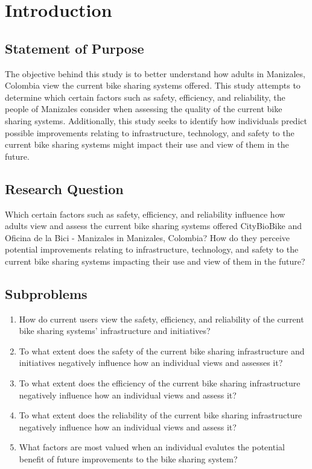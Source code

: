 \documentclass[12pt]{article}
\begin{document}
\section*{Introduction}

\subsection*{Statement of Purpose}
The objective behind this study is to better understand how adults in Manizales, Colombia view the current bike sharing systems offered.
This study attempts to determine which certain factors such as safety, efficiency, and reliability,
the people of Manizales consider when assessing the quality of the current bike sharing systems. Additionally, this study seeks to identify how individuals predict
possible improvements relating to infrastructure, technology, and safety to the current bike sharing systems might 
impact their use and view of them in the future.
\subsection*{Research Question}
Which certain factors such as safety, efficiency, and reliability influence how 
adults view and assess the current bike sharing systems offered CityBioBike and Oficina de la Bici - Manizales in Manizales, Colombia? 
How do they perceive potential improvements relating to infrastructure, technology, and safety
to the current bike sharing systems impacting their use and view of them in the future?

\subsection*{Subproblems}
\begin{enumerate}
    \item How do current users view the safety, efficiency, and reliability of the current bike sharing systems' infrastructure and initiatives?
    \item To what extent does the safety of the current bike sharing infrastructure and initiatives negatively influence how an
    individual views and assesses it?
    \item To what extent does the efficiency of the current bike sharing infrastructure negatively influence how an
    individual views and assess it?
    \item To what extent does the reliability of the current bike sharing infrastructure negatively influence how an
    individual views and assess it?
    \item What factors are most valued when an individual evalutes the potential benefit of future improvements to the bike sharing system?
\end{enumerate}
\end{document}
